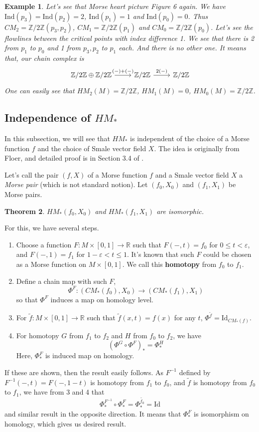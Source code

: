 \documentclass{article}
\newtheorem{theorem}{Theorem}[section]
\newtheorem{example}[theorem]{Example}
\newcommand{\Z}{\mathbb{Z}}
\newcommand{\R}{\mathbb{R}}
\newcommand{\ep}{\varepsilon}
\newcommand{\Ind}{\mathrm{Ind}}
\newcommand{\Id}{\mathrm{Id}}
\begin{document}
	\begin{example}\rm
	Let's see that Morse heart picture Figure 6 again.
	We have $\Ind(p_3)=\Ind(p_2)=2$, $\Ind(p_1)=1$ and $\Ind(p_0)=0$.
	Thus $CM_2=\Z/2\Z(p_3,p_2)$, $CM_1=\Z/2\Z(p_1)$ and $CM_0=\Z/2\Z(p_0)$.
	Let's see the flowlines between the critical points with index difference 1.
	We see that there is 2 from $p_1$ to $p_0$ and 1 from $p_3,p_2$ to $p_1$ each.
	And there is no other one.
	It means that,	 our chain complex is
		$$\begin{tikzcd}
		\Z/2\Z\oplus\Z/2\Z\ar[r,"(-)+(-)"]&\Z/2\Z\ar[r,"2(-)"]&\Z/2\Z
		\end{tikzcd}$$
	One can easily see that $HM_2(M)=\Z/2\Z$, $HM_1(M)=0$, $HM_0(M)=\Z/2\Z$.
	\end{example}

\subsection{Independence of $HM_*$}
In this subsection, we will see that $HM_*$ is independent of the choice of a Morse function $f$ and the choice of Smale vector field $X$.
The idea is originally from Floer, and detailed proof is in Section 3.4 of \cite{ad}.

Let's call the pair $(f,X)$ of a Morse function $f$ and a Smale vector field $X$ a \emph{Morse pair} (which is not standard notion).
Let $(f_0,X_0)$ and $(f_1,X_1)$ be Morse pairs.

	\begin{theorem}\rm
	$HM_*(f_0,X_0)$ and $HM_*(f_1,X_1)$ are isomorphic.
	\end{theorem}

For this, we have several steps.

	\begin{enumerate}
	\item Choose a function $F:M\times[0,1]\to\R$ such that $F(-,t)=f_0$ for $0\leq t<\ep$, and $F(-,1)=f_1$ for $1-\ep<t\leq 1$.
	It's known that such $F$ could be chosen as a Morse function on $M\times[0,1]$.
	We call this \textbf{homotopy} from $f_0$ to $f_1$.
	\item Define a chain map with such $F$,
		$$\Phi^F:(CM_*(f_0),X_0)\to(CM_*(f_1),X_1)$$
	so that $\Phi^F$ induces a map on homology level.
	\item For $\tilde{f}:M\times[0,1]\to\R$ such that $\tilde{f}(x,t)=f(x)$ for any $t$, $\Phi^{\tilde{f}}=\Id_{CM_*(f)}$.
	\item For homotopy $G$ from $f_1$ to $f_2$ and $H$ from $f_0$ to $f_2$, we have
		$$(\Phi^G\circ\Phi^F)_*=\Phi^H_*$$
	Here, $\Phi^F_*$ is induced map on homology.
	\end{enumerate}
If these are shown, then the result easily follows.
As $F^{-1}$ defined by $F^{-1}(-,t)=F(-,1-t)$ is homotopy from $f_1$ to $f_0$, and $\tilde{f}$ is homotopy from $f_0$ to $f_1$, we have from 3 and 4 that
	$$\Phi^{F^{-1}}_*\circ\Phi^{F}_*=\Phi^{\tilde{f_0}}_*=\Id$$
and similar result in the opposite direction.
It means that $\Phi^F_*$ is isomorphism on homology, which gives us desired result.
\end{document}

